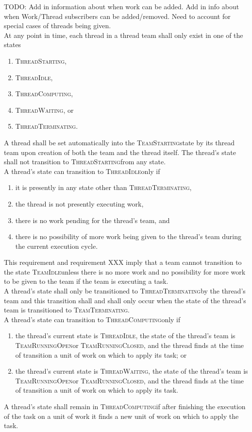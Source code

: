\documentclass{article}
\newcommand{\TeamStarting}      {\textsc{TeamStarting}}
\newcommand{\TeamIdle}          {\textsc{TeamIdle}}
\newcommand{\TeamRunningOpen}   {\textsc{TeamRunningOpen}}
\newcommand{\TeamRunningClosed} {\textsc{TeamRunningClosed}}
\newcommand{\TeamTerminating}   {\textsc{TeamTerminating}}
\newcommand{\ThreadStarting}    {\textsc{ThreadStarting}}
\newcommand{\ThreadIdle}        {\textsc{ThreadIdle}}
\newcommand{\ThreadComputing}   {\textsc{ThreadComputing}}
\newcommand{\ThreadWaiting}     {\textsc{ThreadWaiting}}
\newcommand{\ThreadTerminating} {\textsc{ThreadTerminating}}
\begin{document}
TODO: Add in information about when work can be added.  Add in info about when
Work/Thread subscribers can be added/removed.  Need to account for special cases
of threads being given.\\


At any point in time, each thread in a thread team shall only exist in one of
the states
\begin{enumerate}
\item{\ThreadStarting,}
\item{\ThreadIdle,}
\item{\ThreadComputing,}
\item{\ThreadWaiting, or}
\item{\ThreadTerminating.}
\end{enumerate}

A thread shall be set automatically into the \TeamStarting state by its thread
team upon creation of both the team and the thread itself.  The thread's state
shall not transition to \ThreadStarting from any state. \\

A thread's state can transition to \ThreadIdle only if
\begin{enumerate}
\item{it is presently in any state other than \ThreadTerminating,}
\item{the thread is not presently executing work,}
\item{there is no work pending for the thread's team, and}
\item{there is no possibility of more work being given to the thread's team
during the current execution cycle.}
\end{enumerate}
This requirement and requirement XXX imply that a team cannot transition to the
state \TeamIdle unless there is no more work and no possibility for more work to
be given to the team if the team is executing a task.\\

A thread's state shall only be transitioned to \ThreadTerminating by the
thread's team and this transition shall and shall only occur when the
state of the thread's team is transitioned to \TeamTerminating.\\

A thread's state can transition to \ThreadComputing only if
\begin{enumerate}
\item{the thread's current state is \ThreadIdle, the state of the thread's team
is \TeamRunningOpen or \TeamRunningClosed, and the thread finds at the time of
transition a unit of work on which to apply its task; or}
\item{the thread's current state is \ThreadWaiting, the state of the thread's
team is \TeamRunningOpen or \TeamRunningClosed, and the thread finds at the time
of transition a unit of work on which to apply its task.}
\end{enumerate}
A thread's state shall remain in \ThreadComputing if after finishing the
execution of the task on a unit of work it finds a new unit of work on which to
apply the task.\\
\end{document}
